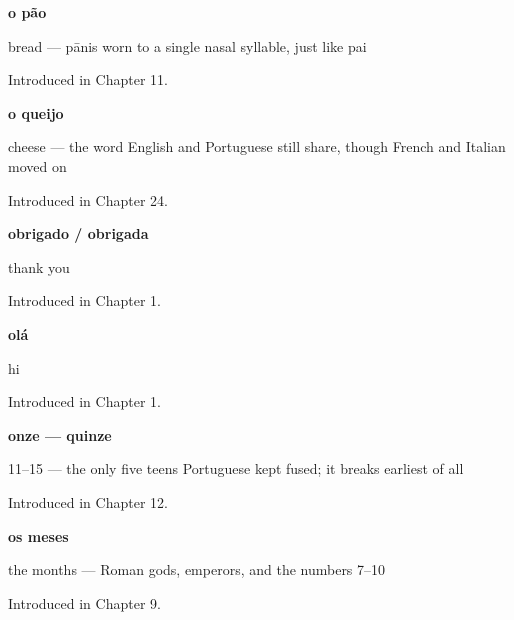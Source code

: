 \noindent\begin{minipage}[t]{\linewidth}
\raggedright
\textbf{o pão}\par
\small bread — pānis worn to a single nasal syllable, just like pai\par
\footnotesize Introduced in Chapter 11.
\end{minipage}\par\medskip

\noindent\begin{minipage}[t]{\linewidth}
\raggedright
\textbf{o queijo}\par
\small cheese — the word English and Portuguese still share, though French and Italian moved on\par
\footnotesize Introduced in Chapter 24.
\end{minipage}\par\medskip

\noindent\begin{minipage}[t]{\linewidth}
\raggedright
\textbf{obrigado / obrigada}\par
\small thank you\par
\footnotesize Introduced in Chapter 1.
\end{minipage}\par\medskip

\noindent\begin{minipage}[t]{\linewidth}
\raggedright
\textbf{olá}\par
\small hi\par
\footnotesize Introduced in Chapter 1.
\end{minipage}\par\medskip

\noindent\begin{minipage}[t]{\linewidth}
\raggedright
\textbf{onze — quinze}\par
\small 11–15 — the only five teens Portuguese kept fused; it breaks earliest of all\par
\footnotesize Introduced in Chapter 12.
\end{minipage}\par\medskip

\noindent\begin{minipage}[t]{\linewidth}
\raggedright
\textbf{os meses}\par
\small the months — Roman gods, emperors, and the numbers 7–10\par
\footnotesize Introduced in Chapter 9.
\end{minipage}\par\medskip

